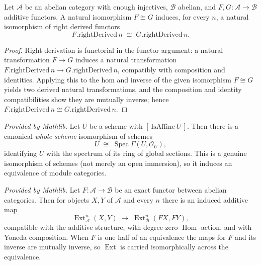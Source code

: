 \begin{lemma}

  \label{lem:rightDerivedNatIso}
  Let \(\mathcal{A}\) be an abelian category with enough injectives, \(\mathcal{B}\) abelian, and
  \(F, G : \mathcal{A} \to \mathcal{B}\) additive functors. A natural isomorphism \(F \cong G\)
  induces, for every \(n\), a natural isomorphism of right derived functors
  \[
    F.\mathrm{rightDerived}\,n \;\cong\; G.\mathrm{rightDerived}\,n.
  \]
\end{lemma}
\begin{proof}

\leanok
  Right derivation is functorial in the functor argument: a natural transformation \(F \to G\)
  induces a natural transformation \(F.\mathrm{rightDerived}\,n \to G.\mathrm{rightDerived}\,n\),
  compatibly with composition and identities. Applying this to the hom and inverse of the given
  isomorphism \(F \cong G\) yields two derived natural transformations, and the composition and
  identity compatibilities show they are mutually inverse; hence
  \(F.\mathrm{rightDerived}\,n \cong G.\mathrm{rightDerived}\,n\).
\end{proof}

\begin{lemma}
  \label{lem:isoSpec_scheme_mathlib}
  \mathlibok
  \textit{Provided by Mathlib.}
  Let \(U\) be a scheme with \([\,\mathrm{IsAffine}\ U\,]\). Then there is a canonical
  \emph{whole-scheme} isomorphism of schemes
  \[
    U \;\cong\; \operatorname{Spec}\Gamma(U, \mathcal{O}_U),
  \]
  identifying \(U\) with the spectrum of its ring of global sections. This is a genuine isomorphism of
  schemes (not merely an open immersion), so it induces an equivalence of module categories.
\end{lemma}

\begin{lemma}
  \label{lem:ext_mapExactFunctor_mathlib}
  \mathlibok
  \textit{Provided by Mathlib.}
  Let \(F : \mathcal{A} \to \mathcal{B}\) be an exact functor between abelian categories. Then for
  objects \(X, Y\) of \(\mathcal{A}\) and every \(n\) there is an induced additive map
  \[
    \operatorname{Ext}^n_{\mathcal{A}}(X, Y) \;\longrightarrow\;
      \operatorname{Ext}^n_{\mathcal{B}}(F X, F Y),
  \]
  compatible with the additive structure, with degree-zero \(\operatorname{Hom}\)-action, and with
  Yoneda composition. When \(F\) is one half of an equivalence the maps for \(F\) and its inverse are
  mutually inverse, so \(\operatorname{Ext}\) is carried isomorphically across the equivalence.
\end{lemma}

